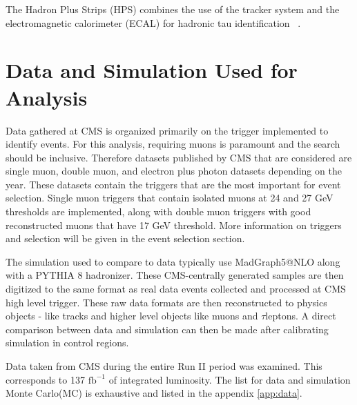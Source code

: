 
The Hadron Plus Strips (HPS) combines the use of the tracker system and the electromagnetic calorimeter (ECAL) for hadronic tau identification ~\cite{Sirunyan_2018}.  


 


\section{Data and Simulation Used for Analysis}
Data gathered at CMS is organized primarily on the trigger implemented to identify events. For this analysis, requiring muons is paramount and the search should be inclusive. Therefore datasets published by CMS that are considered are single muon, double muon, and electron plus photon datasets depending on the year. These datasets contain the triggers that are the most important for event selection. Single muon triggers that contain isolated muons at 24 and 27 GeV thresholds are implemented, along with double muon triggers with good reconstructed muons that have 17 GeV threshold. More information on triggers and selection will be given in the event selection section. 

The simulation used to compare to data typically use MadGraph5@NLO along with a PYTHIA 8 hadronizer. These CMS-centrally generated samples are then digitized to the same format as real data events collected and processed at CMS high level trigger. These raw data formats are then reconstructed to physics objects - like tracks and higher level objects like muons and $\tau$leptons. A direct comparison between data and simulation can then be made after calibrating simulation in control regions. 

Data taken from CMS during the entire Run II period was examined. This corresponds to 137 $\text{fb}^{-1}$ of integrated luminosity. The list for data and simulation Monte Carlo(MC) is exhaustive and listed in the appendix \ref{app:data}.   

